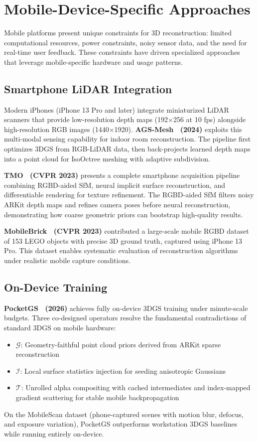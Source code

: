\documentclass[journal]{IEEEtran}
\begin{document}
\section{Mobile-Device-Specific Approaches}
\label{sec:mobile}

Mobile platforms present unique constraints for 3D reconstruction: limited computational resources, power constraints, noisy sensor data, and the need for real-time user feedback. These constraints have driven specialized approaches that leverage mobile-specific hardware and usage patterns.

\subsection{Smartphone LiDAR Integration}

Modern iPhones (iPhone 13 Pro and later) integrate miniaturized LiDAR scanners that provide low-resolution depth maps (192$\times$256 at 10 fps) alongside high-resolution RGB images (1440$\times$1920). \textbf{AGS-Mesh~\cite{agsmesh} (2024)} exploits this multi-modal sensing capability for indoor room reconstruction. The pipeline first optimizes 3DGS from RGB-LiDAR data, then back-projects learned depth maps into a point cloud for IsoOctree meshing with adaptive subdivision.

\textbf{TMO~\cite{tmo} (CVPR 2023)} presents a complete smartphone acquisition pipeline combining RGBD-aided SfM, neural implicit surface reconstruction, and differentiable rendering for texture refinement. The RGBD-aided SfM filters noisy ARKit depth maps and refines camera poses before neural reconstruction, demonstrating how coarse geometric priors can bootstrap high-quality results.

\textbf{MobileBrick~\cite{mobilebrick} (CVPR 2023)} contributed a large-scale mobile RGBD dataset of 153 LEGO objects with precise 3D ground truth, captured using iPhone 13 Pro. This dataset enables systematic evaluation of reconstruction algorithms under realistic mobile capture conditions.

\subsection{On-Device Training}

\textbf{PocketGS~\cite{pocketgs} (2026)} achieves fully on-device 3DGS training under minute-scale budgets. Three co-designed operators resolve the fundamental contradictions of standard 3DGS on mobile hardware:
\begin{itemize}
    \item $\mathcal{G}$: Geometry-faithful point cloud priors derived from ARKit sparse reconstruction
    \item $\mathcal{I}$: Local surface statistics injection for seeding anisotropic Gaussians
    \item $\mathcal{T}$: Unrolled alpha compositing with cached intermediates and index-mapped gradient scattering for stable mobile backpropagation
\end{itemize}
On the MobileScan dataset (phone-captured scenes with motion blur, defocus, and exposure variation), PocketGS outperforms workstation 3DGS baselines while running entirely on-device.
\end{document}
